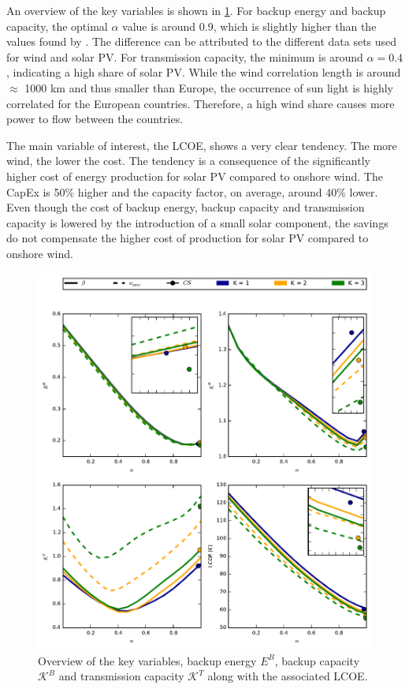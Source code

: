 \documentclass[a4paper, 5p, sort&compress]{elsarticle}%
\begin{document}
An overview of the key variables is shown in \cref{fig:overview}. For
backup energy and backup capacity, the optimal $\alpha$ value is around
0.9, which is slightly higher than the values found by
\cite{Heide2010,Heide2011}. The difference can be attributed to the
different data sets used for wind and solar PV. For transmission
capacity, the minimum is around $\alpha = 0.4$, indicating a high share of
solar PV. While the wind correlation length is around $\approx$ 1000
km \cite{Widen2011} and thus smaller than Europe, the occurrence of
sun light is highly correlated for the European countries.
Therefore, a high wind share causes more power to flow
between the countries.

The main variable of interest, the LCOE, shows a very clear
tendency. The more wind, the lower the cost. The tendency is a consequence
of the significantly higher cost of energy production for solar PV
compared to onshore wind. The CapEx is 50\% higher and the capacity
factor, on average, around 40\% lower. Even though the cost of backup
energy, backup capacity and transmission capacity is lowered by the
introduction of a small solar component, the savings do not compensate
the higher cost of production for solar PV compared to onshore wind.

\begin{figure}[p]
  \centering
  \includegraphics[width = 2 \columnwidth]{data}
  \caption{Overview of the key variables, backup energy $E^{B}$,
    backup capacity $\mathcal{K}^{B}$ and transmission capacity
    $\mathcal{K}^{T}$ along with the associated LCOE.}
  \label{fig:overview}
\end{figure}
\end{document}
